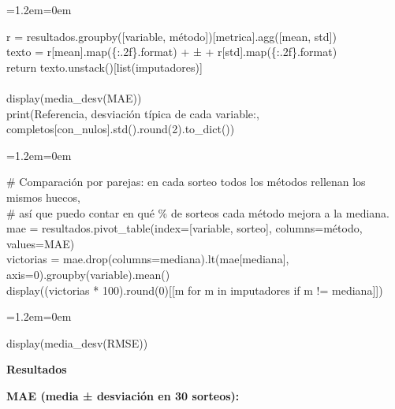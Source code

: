 \documentclass[11pt,a4paper]{article}
\newenvironment{codigo}
  {\par\smallskip\begin{list}{}{\leftmargin=1.2em\rightmargin=0em}\item\relax\ttfamily\scriptsize\raggedright}
  {\end{list}\smallskip}
\begin{document}
{\begin{codigo}
\hspace*{2.08em}r = resultados.groupby([\textquotedbl{}variable\textquotedbl{}, \textquotedbl{}método\textquotedbl{}])[metrica].agg([\textquotedbl{}mean\textquotedbl{}, \textquotedbl{}std\textquotedbl{}]) \\{}
\hspace*{2.08em}texto = r[\textquotedbl{}mean\textquotedbl{}].map(\textquotedbl{}\{:.2f\}\textquotedbl{}.format) + \textquotedbl{} ± \textquotedbl{} + r[\textquotedbl{}std\textquotedbl{}].map(\textquotedbl{}\{:.2f\}\textquotedbl{}.format) \\{}
\hspace*{2.08em}return texto.unstack()[list(imputadores)] \\{}
\mbox{} \\{}
display(media\_\allowbreak{}desv(\textquotedbl{}MAE\textquotedbl{})) \\{}
print(\textquotedbl{}Referencia, desviación típica de cada variable:\textquotedbl{}, completos[con\_\allowbreak{}nulos].std().round(2).to\_\allowbreak{}dict())
\end{codigo}
\begin{codigo}
\# Comparación por parejas: en cada sorteo todos los métodos rellenan los mismos huecos, \\{}
\# así que puedo contar en qué \% de sorteos cada método mejora a la mediana. \\{}
mae = resultados.pivot\_\allowbreak{}table(index=[\textquotedbl{}variable\textquotedbl{}, \textquotedbl{}sorteo\textquotedbl{}], columns=\textquotedbl{}método\textquotedbl{}, values=\textquotedbl{}MAE\textquotedbl{}) \\{}
victorias = mae.drop(columns=\textquotedbl{}mediana\textquotedbl{}).lt(mae[\textquotedbl{}mediana\textquotedbl{}], axis=0).groupby(\textquotedbl{}variable\textquotedbl{}).mean() \\{}
display((victorias * 100).round(0)[[m for m in imputadores if m != \textquotedbl{}mediana\textquotedbl{}]])
\end{codigo}
\begin{codigo}
display(media\_\allowbreak{}desv(\textquotedbl{}RMSE\textquotedbl{}))
\end{codigo}
\smallskip\noindent\textbf{Resultados}\par
\textbf{MAE (media ± desviación en 30 sorteos):}

}
\end{document}
